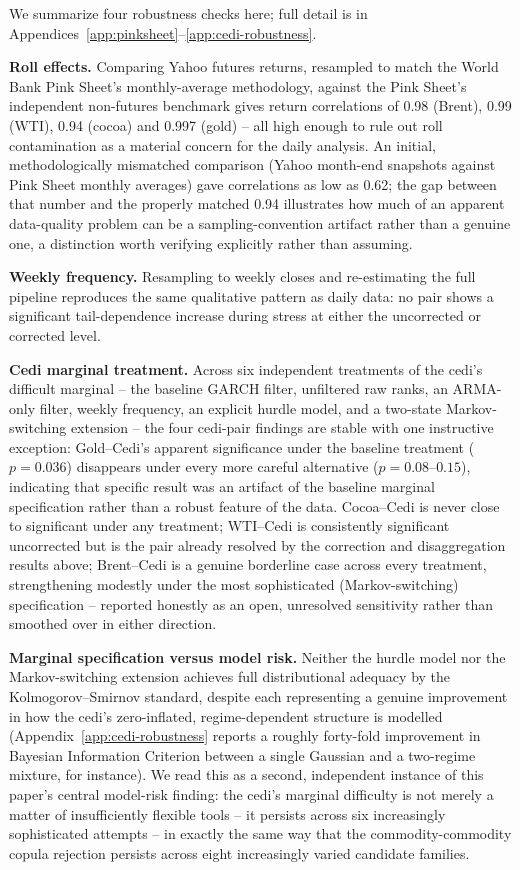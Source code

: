 \documentclass[final,3p,times,authoryear]{elsarticle}
\begin{document}
We summarize four robustness checks here; full detail is in
Appendices~\ref{app:pinksheet}--\ref{app:cedi-robustness}.

\textbf{Roll effects.} Comparing Yahoo futures returns, resampled to
match the World Bank Pink Sheet's monthly-average methodology, against
the Pink Sheet's independent non-futures benchmark gives return
correlations of 0.98 (Brent), 0.99 (WTI), 0.94 (cocoa) and 0.997 (gold)
-- all high enough to rule out roll contamination as a material concern
for the daily analysis. An initial, methodologically mismatched
comparison (Yahoo month-end snapshots against Pink Sheet monthly
averages) gave correlations as low as 0.62; the gap between that number
and the properly matched 0.94 illustrates how much of an apparent
data-quality problem can be a sampling-convention artifact rather than a
genuine one, a distinction worth verifying explicitly rather than
assuming.

\textbf{Weekly frequency.} Resampling to weekly closes and re-estimating
the full pipeline reproduces the same qualitative pattern as daily data:
no pair shows a significant tail-dependence increase during stress at
either the uncorrected or corrected level.

\textbf{Cedi marginal treatment.} Across six independent treatments of
the cedi's difficult marginal -- the baseline GARCH filter, unfiltered
raw ranks, an ARMA-only filter, weekly frequency, an explicit hurdle
model, and a two-state Markov-switching extension -- the four cedi-pair
findings are stable with one instructive exception: Gold--Cedi's
apparent significance under the baseline treatment ($p=0.036$)
disappears under every more careful alternative ($p=0.08$--$0.15$),
indicating that specific result was an artifact of the baseline
marginal specification rather than a robust feature of the data.
Cocoa--Cedi is never close to significant under any treatment;
WTI--Cedi is consistently significant uncorrected but is the pair
already resolved by the correction and disaggregation results above;
Brent--Cedi is a genuine borderline case across every treatment,
strengthening modestly under the most sophisticated (Markov-switching)
specification -- reported honestly as an open, unresolved sensitivity
rather than smoothed over in either direction.

\textbf{Marginal specification versus model risk.} Neither the hurdle
model nor the Markov-switching extension achieves full distributional
adequacy by the Kolmogorov--Smirnov standard, despite each representing
a genuine improvement in how the cedi's zero-inflated, regime-dependent
structure is modelled (Appendix~\ref{app:cedi-robustness} reports a
roughly forty-fold improvement in Bayesian Information Criterion between
a single Gaussian and a two-regime mixture, for instance). We read this
as a second, independent instance of this paper's central model-risk
finding: the cedi's marginal difficulty is not merely a matter of
insufficiently flexible tools -- it persists across six increasingly
sophisticated attempts -- in exactly the same way that the
commodity-commodity copula rejection persists across eight increasingly
varied candidate families.
\end{document}
